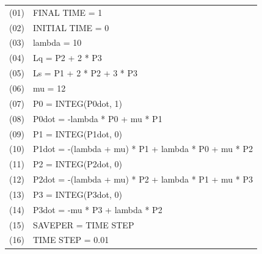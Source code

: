 	\begin{center}
		\begin{tabular}{|l l|}
			\hline
			(01) & FINAL TIME = 1 \\
			(02) & INITIAL TIME = 0 \\
			(03) & lambda = 10 \\
			(04) & Lq = P2 + 2 * P3 \\
			(05) & Ls = P1 + 2 * P2 + 3 * P3 \\
			(06) & mu = 12 \\
			(07) & P0 = INTEG(P0dot, 1) \\
			(08) & P0dot = -lambda * P0 + mu * P1 \\
			(09) & P1 = INTEG(P1dot, 0) \\
			(10) & P1dot = -(lambda + mu) * P1 + lambda * P0 + mu * P2 \\
			(11) & P2 = INTEG(P2dot, 0) \\
			(12) & P2dot = -(lambda + mu) * P2 + lambda * P1 + mu * P3 \\
			(13) & P3 = INTEG(P3dot, 0) \\
			(14) & P3dot = -mu * P3 + lambda * P2 \\
			(15) & SAVEPER = TIME STEP \\
			(16) & TIME STEP = 0.01 \\
			\hline
		\end{tabular}
	\end{center}
	
